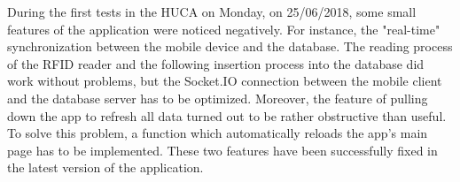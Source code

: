 During the first tests in the HUCA on Monday, on 25/06/2018, some small features of the application were noticed negatively. For instance, the "real-time" synchronization between the mobile device and the database. The reading process of the RFID reader and the following insertion process into the database did work without problems, but the Socket.IO connection between the mobile client and the database server has to be optimized. Moreover, the feature of pulling down the app to refresh all data turned out to be rather obstructive than useful. To solve this problem, a function which automatically reloads the app's main page has to be implemented. These two features have been successfully fixed in the latest version of the application.